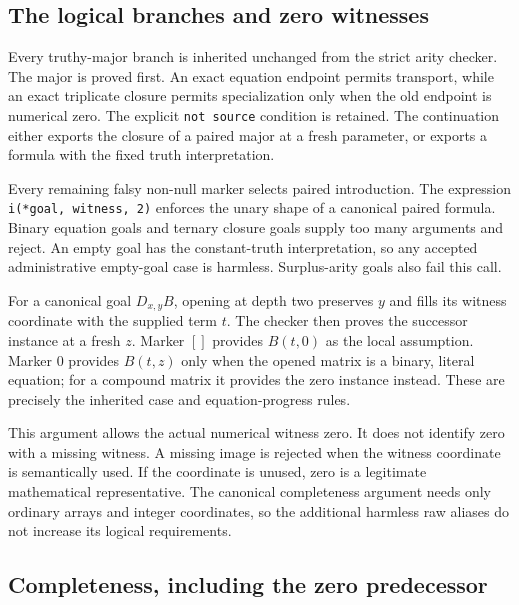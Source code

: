 \subsection{The logical branches and zero witnesses}

Every truthy-major branch is inherited unchanged from the strict arity
checker.  The major is proved first.  An exact equation endpoint permits
transport, while an exact triplicate closure permits specialization
only when the old endpoint is numerical zero.  The explicit
\texttt{not source} condition is retained.  The continuation either
exports the closure of a paired major at a fresh parameter, or exports
a formula with the fixed truth interpretation.

Every remaining falsy non-null marker selects paired introduction.
The expression \texttt{i(*goal, witness, 2)} enforces the unary shape of
a canonical paired formula.  Binary equation goals and ternary closure
goals supply too many arguments and reject.  An empty goal has the
constant-truth interpretation, so any accepted administrative empty-goal
case is harmless.  Surplus-arity goals also fail this call.

For a canonical goal $D_{x,y}B$, opening at depth two preserves $y$ and
fills its witness coordinate with the supplied term $t$.  The checker
then proves the successor instance at a fresh $z$.  Marker $[]$
provides $B(t,0)$ as the local assumption.  Marker $0$ provides
$B(t,z)$ only when the opened matrix is a binary, literal equation;
for a compound matrix it provides the zero instance instead.  These
are precisely the inherited case and equation-progress rules.

This argument allows the actual numerical witness zero.  It does not
identify zero with a missing witness.  A missing image is rejected when
the witness coordinate is semantically used.  If the coordinate is
unused, zero is a legitimate mathematical representative.  The
canonical completeness argument needs only ordinary arrays and integer
coordinates, so the additional harmless raw aliases do not increase
its logical requirements.

\subsection{Completeness, including the zero predecessor}


